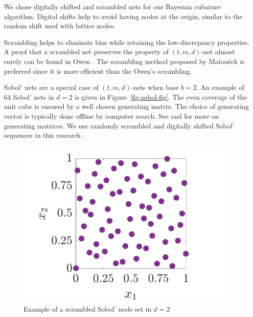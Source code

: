 \documentclass{iitthesis}          %
\newcommand{\bm}[1]{\boldsymbol{#1}}
\newcommand{\vx}{\bm{x}}
\newcommand{\vz}{\bm{z}}
\newcommand\figref{Figure~\ref}
\newcommand{\JRNote}[1]{}
\begin{document}
We chose digitally shifted and scrambled nets \cite{HicYue00} for our Bayesian cubature algorithm. Digital shifts help to avoid having nodes at the origin, similar to the random shift used with lattice nodes.

Scrambling helps to eliminate bias while retaining the low-discrepancy properties.
A proof that a scrambled net preserves the property of $(t, m, d)$-net almost surely can be found in Owen \cite{Owe95}. The scrambling method proposed by Matou\v{s}ek \cite{Mat98} is preferred since it is more efficient than the Owen's scrambling.

Sobol' nets \cite{Sob76} are a special case of $(t,m, d)$-nets when base $b=2$. 
An example of $64$ Sobol' nets in $d=2$ is given in \figref{fig:sobol-fig}.  The even coverage of the unit cube is ensured by a well chosen generating matrix.  The choice of generating vector is typically done offline by computer search.  See \cite{KuoNuyens2016} and \cite{NuySoft} for more on generating matrices. We use randomly scrambled and digitally shifted Sobol' sequences in this research \cite{HonHic00a}. 

\begin{figure}[htp]
	\label{fig:sobol-fig}
	\centering
	\includegraphics[width=0.8\linewidth]{SSobolPoints}
	\caption{Example of a scrambled Sobol' node set  in $d=2$ \label{sobolfig} }
\end{figure}
\end{document}
